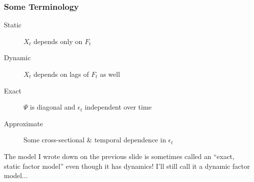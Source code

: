 \documentclass[handout]{beamer}
\begin{document}
\begin{frame}[c]\frametitle{Some Terminology}
 
\begin{description}
	\item[Static] $X_t$ depends only on $F_t$
	\item[Dynamic] $X_t$ depends on lags of $F_t$ as well
	\item[Exact] $\Psi$ is diagonal and $\epsilon_t$ independent over time
	\item[Approximate] Some cross-sectional \& temporal dependence in $\epsilon_t$
\end{description}

\vspace{1em}

\alert{The model I wrote down on the previous slide is sometimes called an ``exact, static factor model'' even though it has dynamics! I'll still call it a dynamic factor model...}

\end{frame}
\end{document}
